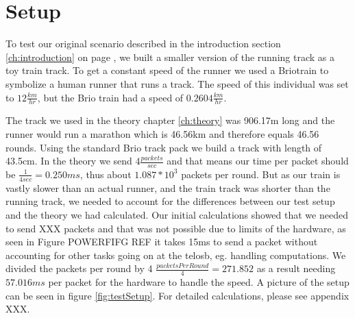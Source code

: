 \section{Setup}\label{sc:setup}

To test our original scenario described in the introduction section \ref{ch:introduction} on page \pageref{ch:introduction}, we built a smaller version of the running track as a toy train track. To get a constant speed of the runner we used a Brio\texttrademark train to symbolize a human runner that runs a track. The speed of this individual was set to $12\frac{km}{hr}$, but the Brio train had a speed of $0.2604\frac{km}{hr}$.

\noindent The track we used in the theory chapter \ref{ch:theory} was 906.17m long and the runner would run a marathon which is 46.56km and therefore equals 46.56 rounds. Using the standard Brio track pack we build a track with length of 43.5cm. In the theory we send $4\frac{packets}{sec}$ and that means our time per packet should be $\frac{1}{4sec} = 0.250ms$, thus about $1.087*10^3$ packets per round. But as our train is vastly slower than an actual runner, and the train track was shorter than the running track, we needed to account for the differences between our test setup and the theory we had calculated. Our initial calculations showed that we needed to send XXX packets and that was not possible due to limits of the hardware, as seen in Figure POWERFIFG REF it takes 15ms to send a packet without accounting for other tasks going on at the telosb, eg. handling computations. We divided the packets per round by 4 $ \frac{packetsPerRound}{4} = 271.852 $ as a result needing $57.016 ms$ per packet for the hardware to handle the speed. A picture of the setup can be seen in figure \ref{fig:testSetup}. For detailed calculations, please see appendix XXX.
